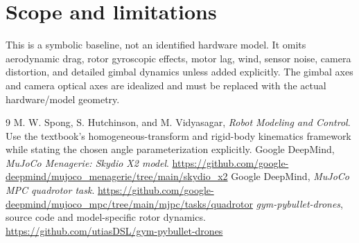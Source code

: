 \documentclass[11pt,a4paper]{article}
\begin{document}
\section{Scope and limitations}
This is a symbolic baseline, not an identified hardware model. It omits aerodynamic drag, rotor gyroscopic effects, motor lag, wind, sensor noise, camera distortion, and detailed gimbal dynamics unless added explicitly. The gimbal axes and camera optical axes are idealized and must be replaced with the actual hardware/model geometry.

\begin{thebibliography}{9}
 M. W. Spong, S. Hutchinson, and M. Vidyasagar, \textit{Robot Modeling and Control}. Use the textbook's homogeneous-transform and rigid-body kinematics framework while stating the chosen angle parameterization explicitly.
 Google DeepMind, \textit{MuJoCo Menagerie: Skydio X2 model}. \url{https://github.com/google-deepmind/mujoco_menagerie/tree/main/skydio_x2}
 Google DeepMind, \textit{MuJoCo MPC quadrotor task}. \url{https://github.com/google-deepmind/mujoco_mpc/tree/main/mjpc/tasks/quadrotor}
 \textit{gym-pybullet-drones}, source code and model-specific rotor dynamics. \url{https://github.com/utiasDSL/gym-pybullet-drones}
\end{thebibliography}
\end{document}
